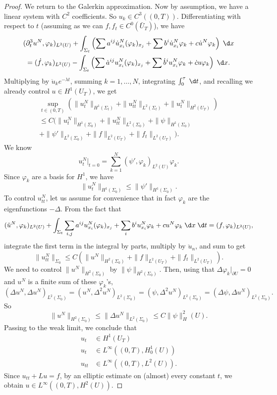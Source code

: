 \documentclass[a4paper]{article}
\begin{document}
\begin{proof}
  We return to the Galerkin approximation. Now by assumption, we have a linear system with $C^2$ coefficients. So $u_k \in C^3((0, T))$. Differentiating with respect to $t$ (assuming as we can $f, f_t \in C^0(\bar{U}_T)$), we have
  \begin{multline*}
    (\partial_t^3 u^N, \varphi_k)_{L^2(U)} + \int_{\Sigma_t} \left(\sum a^{ij} \dot{u}_{x_i}^N (\varphi_k)_{x_j} + \sum b^i \dot{u}_{x_i}^N \varphi_k + c \dot{u}^N \varphi_k \right) \;\d x\\
    = (\dot{f}, \varphi_k)_{L^2(U)} - \int_{\Sigma_t} \left( \sum \dot{a}^{ij} u_{x_i}^N (\varphi_k)_{x_j} + \sum \dot{b}^i u_{x_i}^N \varphi_k + \dot{c} u \varphi_k \right)\;\d x.
  \end{multline*}
  Multiplying by $\ddot{u}_k e^{-\lambda t}$, summing $k = 1, \ldots, N$, integrating $\int_0^\tau \;\d t$, and recalling we already control $u \in H^1(U_T)$, we get
  \begin{multline*}
    \sup_{t \in (0, T)} (\|u_t^N\|_{H^1(\Sigma_t)} + \|u_{tt}^N\|_{L^2(\Sigma_t)} + \|u_t^N\|_{H^2(U_T)})\\
    \leq C\Big(\|u_t^N\|_{H^1(\Sigma_0)} + \|u_{tt}^N\|_{L^2(\Sigma_0)} + \|\psi\|_{H^1(\Sigma_0)} \\
    + \|\psi'\|_{L^2(\Sigma_0)} + \|f\|_{L^2(U_T)} + \|f_t\|_{L^2(U_T)}\Big).
  \end{multline*}
  We know
  \[
    u_t^N|_{t = 0} = \sum_{k = 1}^N (\psi', \varphi_k)_{L^2(U)} \varphi_k.
  \]
  Since $\varphi_k$ are a basis for $H^1$, we have
  \[
    \|u_t^N\|_{H^1(\Sigma_0)} \leq \|\psi'\|_{H^1(\Sigma_0)}.
  \]
  To control $u^N_{tt}$, let us assume for convenience that in fact $\varphi_k$ are the eigenfunctions $-\Delta$. From the fact that
  \[
    (\ddot{u}^N, \varphi_k)_{L^2(U)} + \int_{\Sigma_t} \sum_{i, j} a^{ij} u_{x_i}^N (\varphi_k)_{x_j} + \sum_i b^i u_{x_i}^N \varphi_k + c u^N \varphi_k\;\d x\;\d t = (f, \varphi_k)_{L^2(U)},
  \]
  integrate the first term in the integral by parts, multiply by $\ddot{u}_n$, and sum to get
  \[
    \|u_{tt}^N\|_{\Sigma_0} \leq C(\|u^N\|_{H^2(\Sigma_0)} + \|f\|_{L^2(U_T)} + \|f_t\|_{L^2(U_T)}).
  \]
  We need to control $\|u^N\|_{H^2(\Sigma_0)}$ by $\|\psi\|_{H^2(\Sigma_0)}$. Then, using that $\Delta\varphi_k|_{\partial U} = 0$ and $u^N$ is a finite sum of these $\varphi_k$'s,
  \[
    (\Delta u^N, \Delta u^N)_{L^2(\Sigma_0)} = (u^N, \Delta^2 u^N)_{L^2(\Sigma_0)} = (\psi, \Delta^2 u^N)_{L^2(\Sigma_0)} = (\Delta \psi, \Delta u^N)_{L^2(\Sigma_0)}.
  \]
  So
  \[
    \|u^N\|_{H^2(\Sigma_0)} \leq \|\Delta u^N\|_{L^2(\Sigma_0)} \leq C \|\psi\|_H^2(U).
  \]
  Passing to the weak limit, we conclude that
  \begin{align*}
    u_t &\in H^1(U_T)\\
    u_t &\in L^\infty((0, T), H_0^1(U))\\
    u_{tt} &\in L^\infty((0, T), L^2(U)).
  \end{align*}
  Since $u_{tt} + Lu = f$, by an elliptic estimate on (almost) every constant $t$, we obtain $u \in L^\infty((0, T), H^2(U))$.
\end{proof}
\end{document}
